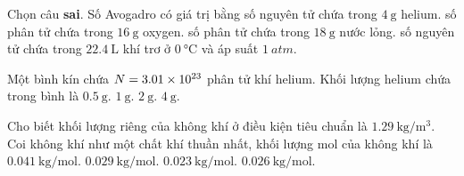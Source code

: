 \begin{ex}
Chọn câu \textbf{sai}. Số Avogadro có giá trị bằng	
	\choice
	{số nguyên tử chứa trong $\SI{4}{\gram}$ helium.}
	{\True số phân tử chứa trong $\SI{16}{\gram}$ oxygen.}
	{số phân tử chứa trong $\SI{18}{\gram}$ nước lỏng.}
	{số nguyên tử chứa trong $\SI{22.4}{\liter}$ khí trơ ở $\SI{0}{\celsius}$ và áp suất $\SI{1}{atm}$.}
	\loigiai{}
\end{ex}
\begin{ex}
Một bình kín chứa $N=\SI{3.01E23}{}$ phân tử khí helium. Khối lượng helium chứa trong bình là	
	\choice
	{$\SI{0.5}{\gram}$.}
	{$\SI{1}{\gram}$.}
	{\True $\SI{2}{\gram}$.}
	{$\SI{4}{\gram}$.}
	\loigiai{}
\end{ex}
\begin{ex}
	Cho biết khối lượng riêng của không khí ở điều kiện tiêu chuẩn là $\SI{1.29}{\kilogram/\meter^3}$. Coi không khí như một chất khí thuần nhất, khối lượng mol của không khí là
	\choice
	{$\SI{0.041}{\kilogram/\mole}$.}
	{\True $\SI{0.029}{\kilogram/\mole}$.}
	{$\SI{0.023}{\kilogram/\mole}$.}
	{$\SI{0.026}{\kilogram/\mole}$.}
\end{ex}
